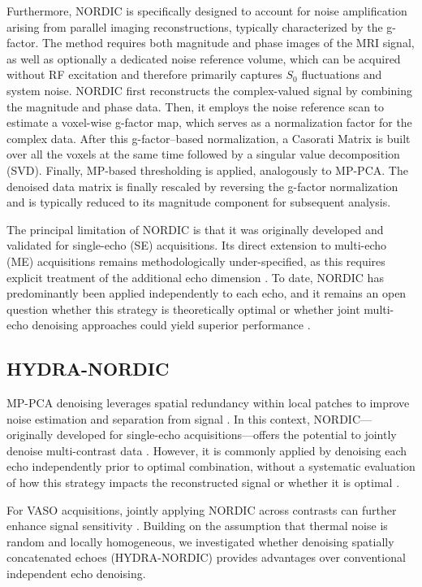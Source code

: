 Furthermore, NORDIC is specifically designed to account for noise amplification arising from parallel imaging reconstructions, typically characterized by the g-factor. The method requires both magnitude and phase images of the MRI signal, as well as optionally a dedicated noise reference volume, which can be acquired without RF excitation and therefore primarily captures $S_0$ fluctuations and system noise. NORDIC first reconstructs the complex-valued signal by combining the magnitude and phase data. Then, it employs the noise reference scan to estimate a voxel-wise g-factor map, which serves as a normalization factor for the complex data. After this g-factor–based normalization, a Casorati Matrix is built over all the voxels at the same time followed by a singular value decomposition (SVD). Finally, MP-based thresholding is applied, analogously to MP-PCA. The denoised data matrix is finally rescaled by reversing the g-factor normalization and is typically reduced to its magnitude component for subsequent analysis.

The principal limitation of NORDIC is that it was originally developed and validated for single-echo (SE) acquisitions. Its direct extension to multi-echo (ME) acquisitions remains methodologically under-specified, as this requires explicit treatment of the additional echo dimension \citep{knudsenNORDICDenoisingVASO2025}. To date, NORDIC has predominantly been applied independently to each echo, and it remains an open question whether this strategy is theoretically optimal or whether joint multi-echo denoising approaches could yield superior performance \citep{moserMultiechoAcquisitionThermal2024}.

\subsection{HYDRA-NORDIC}

MP-PCA denoising leverages spatial redundancy within local patches to improve noise estimation and separation from signal \citep{veraart2016denoising}. In this context, NORDIC—originally developed for single-echo acquisitions—offers the potential to jointly denoise multi-contrast data \citep{vizioli2021lowering,nigi2023improved}. However, it is commonly applied by denoising each echo independently prior to optimal combination, without a systematic evaluation of how this strategy impacts the reconstructed signal or whether it is optimal \citep{moserMultiechoAcquisitionThermal2025} .

For VASO acquisitions, jointly applying NORDIC across contrasts can further enhance signal sensitivity \citep{knudsenNORDICDenoisingVASO2025}. Building on the assumption that thermal noise is random and locally homogeneous, we investigated whether denoising spatially concatenated echoes (HYDRA-NORDIC) provides advantages over conventional independent echo denoising.

